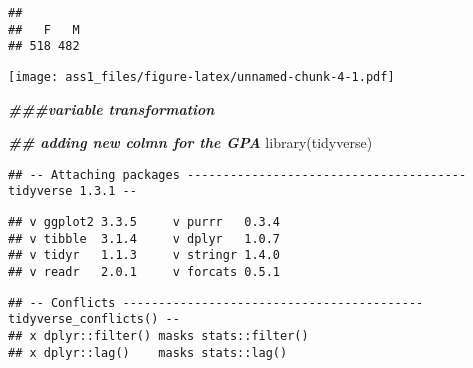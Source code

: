 \documentclass[
]{article}
\newenvironment{Shaded}{\begin{snugshade}}{\end{snugshade}}
\newcommand{\AttributeTok}[1]{\textcolor[rgb]{0.77,0.63,0.00}{#1}}
\newcommand{\DecValTok}[1]{\textcolor[rgb]{0.00,0.00,0.81}{#1}}
\newcommand{\DocumentationTok}[1]{\textcolor[rgb]{0.56,0.35,0.01}{\textbf{\textit{#1}}}}
\newcommand{\FunctionTok}[1]{\textcolor[rgb]{0.00,0.00,0.00}{#1}}
\newcommand{\NormalTok}[1]{#1}
\newcommand{\OtherTok}[1]{\textcolor[rgb]{0.56,0.35,0.01}{#1}}
\newcommand{\SpecialCharTok}[1]{\textcolor[rgb]{0.00,0.00,0.00}{#1}}
\newcommand{\StringTok}[1]{\textcolor[rgb]{0.31,0.60,0.02}{#1}}
\begin{document}
\begin{verbatim}
## 
##   F   M 
## 518 482
\end{verbatim}

\begin{Shaded}
\end{Shaded}

\texttt{[image: ass1\_files/figure-latex/unnamed-chunk-4-1.pdf]}

\begin{Shaded}
\begin{Highlighting}[]
\DocumentationTok{\#\#\#variable transformation}

\DocumentationTok{\#\# adding new colmn for the GPA }
\FunctionTok{library}\NormalTok{(tidyverse)}
\end{Highlighting}
\end{Shaded}

\begin{verbatim}
## -- Attaching packages --------------------------------------- tidyverse 1.3.1 --
\end{verbatim}

\begin{verbatim}
## v ggplot2 3.3.5     v purrr   0.3.4
## v tibble  3.1.4     v dplyr   1.0.7
## v tidyr   1.1.3     v stringr 1.4.0
## v readr   2.0.1     v forcats 0.5.1
\end{verbatim}

\begin{verbatim}
## -- Conflicts ------------------------------------------ tidyverse_conflicts() --
## x dplyr::filter() masks stats::filter()
## x dplyr::lag()    masks stats::lag()
\end{verbatim}

\begin{Shaded}
\end{Shaded}
\end{document}
